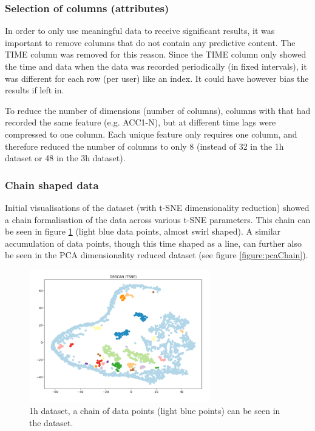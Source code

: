 \subsubsection{Selection of columns (attributes)}
In order to only use meaningful data to receive significant results, it was important to remove columns that do not contain any predictive content. The TIME column was removed for this reason. Since the TIME column only showed the time and data when the data was recorded periodically (in fixed intervals), it was different for each row (per user) like an index. It could have however bias the results if left in. 

To reduce the number of dimensions (number of columns), columns with that had recorded the same feature (e.g. ACC1-N), but at different time lags were compressed to one column. Each unique feature only requires one column, and therefore reduced the number of columns to only 8 (instead of 32 in the 1h dataset or 48 in the 3h dataset).


\subsubsection{Chain shaped data}
Initial visualisations of the dataset (with t-SNE dimensionality reduction) showed a chain formalisation of the data across various t-SNE parameters. This chain can be seen in figure \ref{figure:tsneChain} (light blue data points, almost swirl shaped). A similar accumulation of data points, though this time shaped as a line, can further also be seen in the PCA dimensionality reduced dataset (see figure \ref{figure:pcaChain}). 


\begin{figure}[h]
  \centering
  \includegraphics[width=0.7\textwidth]{./images/tsneChain.png}
  \caption{1h dataset, a chain of data points (light blue points) can be seen in the dataset.}
  \label{figure:tsneChain}
\end{figure}


